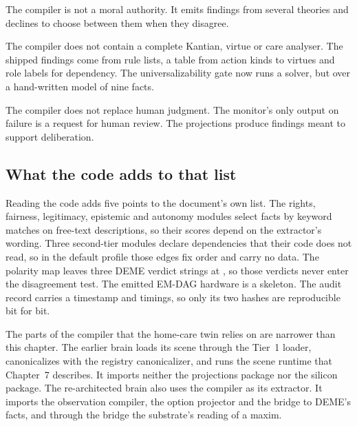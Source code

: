The compiler is not a moral authority. It emits findings from several theories and declines to
choose between them when they disagree.

The compiler does not contain a complete Kantian, virtue or care analyser. The shipped findings
come from rule lists, a table from action kinds to virtues and role labels for dependency. The
universalizability gate now runs a solver, but over a hand-written model of nine facts.

The compiler does not replace human judgment. The monitor's only output on failure is a request
for human review. The projections produce findings meant to support deliberation.

\subsection{What the code adds to that list}

Reading the code adds five points to the document's own list. The rights, fairness, legitimacy,
epistemic and autonomy modules select facts by keyword matches on free-text descriptions, so their
scores depend on the extractor's wording. Three second-tier modules declare dependencies that their
code does not read, so in the default profile those edges fix order and carry no data. The polarity
map leaves three DEME verdict strings at , so those verdicts never enter the
disagreement test. The emitted EM-DAG hardware is a skeleton. The audit record carries a timestamp
and timings, so only its two hashes are reproducible bit for bit.

The parts of the compiler that the home-care twin relies on are narrower than this chapter. The
earlier brain loads its scene through the Tier~1 loader, canonicalizes with the registry
canonicalizer, and runs the scene runtime that Chapter~7 describes. It imports neither the
projections package nor the silicon package. The re-architected brain also uses the compiler as
its extractor. It imports the observation compiler, the option projector and the bridge to DEME's
facts, and through the bridge the substrate's reading of a maxim.
